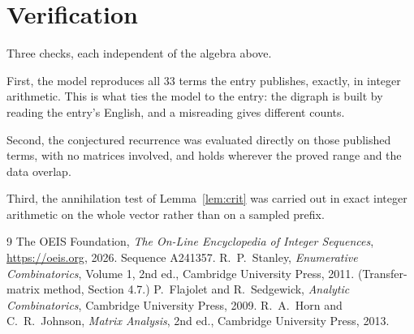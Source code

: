 \documentclass[11pt,a4paper]{article}
\theoremstyle{plain}
\theoremstyle{definition}
\begin{document}
\section{Verification}

Three checks, each independent of the algebra above.

First, the model reproduces all $33$ terms the entry publishes, exactly, in integer
arithmetic. This is what ties the model to the entry: the digraph is built by reading the
entry's English, and a misreading gives different counts.

Second, the conjectured recurrence was evaluated directly on those published terms, with no
matrices involved, and holds wherever the proved range and the data overlap.

Third, the annihilation test of Lemma~\ref{lem:crit} was carried out in exact integer
arithmetic on the whole vector rather than on a sampled prefix.

\begin{thebibliography}{9}
 The OEIS Foundation, \emph{The On-Line Encyclopedia of Integer
Sequences}, \url{https://oeis.org}, 2026. Sequence A241357.
 R.~P.~Stanley, \emph{Enumerative Combinatorics}, Volume 1, 2nd ed.,
Cambridge University Press, 2011. (Transfer-matrix method, Section 4.7.)
 P.~Flajolet and R.~Sedgewick, \emph{Analytic Combinatorics}, Cambridge
University Press, 2009.
 R.~A.~Horn and C.~R.~Johnson, \emph{Matrix Analysis}, 2nd ed., Cambridge
University Press, 2013.
\end{thebibliography}
\end{document}
